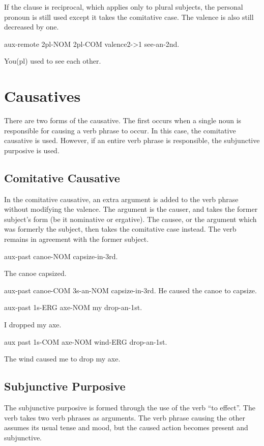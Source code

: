 If the clause is reciprocal, which applies only to plural subjects, the personal
pronoun is still used except it takes the comitative case. The valence is also
still decreased by one.

aux-remote 2pl-NOM 2pl-COM valence2->1 see-an-2nd.

You(pl) used to see each other.

\section{Causatives}

There are two forms of the causative. The first occurs when a single noun is
responsible for causing a verb phrase to occur. In this case, the comitative
causative is used. However, if an entire verb phrase is responsible, the
subjunctive purposive is used.

\subsection{Comitative Causative}

In the comitative causative, an extra argument is added to the verb phrase
without modifying the valence. The argument is the causer, and takes the former
subject's form (be it nominative or ergative). The causee, or the argument which
was formerly the subject, then takes the comitative case instead. The verb
remains in agreement with the former subject.

aux-past canoe-NOM capsize-in-3rd.

The canoe capsized.

aux-past canoe-COM 3s-an-NOM capsize-in-3rd.
He caused the canoe to capsize.

aux-past 1s-ERG axe-NOM my drop-an-1st.

I dropped my axe.

aux past 1s-COM axe-NOM wind-ERG drop-an-1st.

The wind caused me to drop my axe.

\subsection{Subjunctive Purposive}

The subjunctive purposive is formed through the use of the verb ``to effect''.
The verb takes two verb phrases as arguments. The verb phrase causing the other
assumes its usual tense and mood, but the caused action becomes present and
subjunctive.

